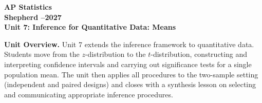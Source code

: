 \documentclass[10pt]{article}
\begin{document}
\vspace{-1.3in}

\begin{center}
  {\color{white}\bfseries\fontsize{24}{30}\selectfont AP Statistics}\\[5pt]
  {\color{goldacc}\bfseries\large Shepherd --2027}\\[10pt]
  {\color{white}\bfseries\Large Unit 7: Inference for Quantitative Data: Means}\\[3pt]
\end{center}

\vspace{0.18in}

\begin{tcolorbox}[colback=sky,colframe=navy,boxrule=0.9pt,arc=2mm,
    left=4mm,right=4mm,top=2mm,bottom=2mm]
  \small\textbf{Unit Overview.}\quad
  Unit 7 extends the inference framework to quantitative data. Students move from the
  $z$-distribution to the $t$-distribution, constructing and interpreting confidence
  intervals and carrying out significance tests for a single population mean. The unit
  then applies all procedures to the two-sample setting (independent and paired designs)
  and closes with a synthesis lesson on selecting and communicating appropriate inference
  procedures.
\end{tcolorbox}

\vspace{0.14in}
\end{document}

